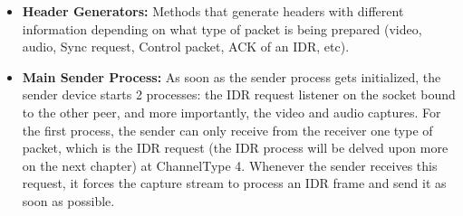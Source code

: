 \documentclass{article}
\begin{document}
\begin{itemize}
    \item \textbf{Header Generators:} Methods that generate headers with different information depending on what type of packet is being prepared (video, audio, Sync request, Control packet, ACK of an IDR, etc). 
    \item \textbf{Main Sender Process:} As soon as the sender process gets initialized, the sender device starts 2 processes: the IDR request listener on the socket bound to the other peer, and more importantly, the video and audio captures. For the first process, the sender can only receive from the receiver one type of packet, which is the IDR request (the IDR process will be delved upon more on the next chapter) at ChannelType 4. Whenever the sender receives this request, it forces the capture stream to process an IDR frame
    and send it as soon as possible.


\end{itemize}
\end{document}
